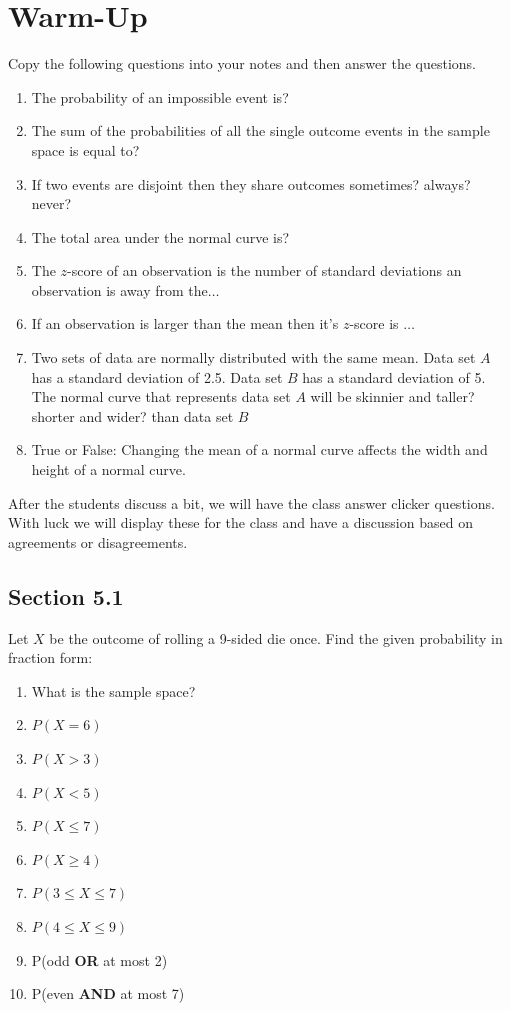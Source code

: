 \documentclass[11pt]{scrartcl}
\theoremstyle{definition}
\begin{document}
\section*{Warm-Up}
Copy the following questions into your notes and then answer the questions.
\begin{enumerate}
	\item The probability of an impossible event is?
	\item The sum of the probabilities of all the single outcome events in the sample space is equal to?
	\item If two events are disjoint then they share outcomes sometimes? always? never?
	\item The total area under the normal curve is?
	\item The $z$-score of an observation is the number of standard deviations an observation is away from the$\ldots$
	\item If an observation is larger than the mean then it's $z$-score is $\ldots$
	\item Two sets of data are normally distributed with the same mean. Data set $A$ has a standard deviation of 2.5. Data set $B$ has a standard deviation of 5. The normal curve that represents data set $A$ will be skinnier and taller? shorter and wider? than data set $B$
	\item True or False: Changing the mean of a normal curve affects the width and height of a normal curve.
	\end{enumerate}

\noindent
After the students discuss a bit, we will have the class answer clicker questions. With luck we will display these for the class and have a discussion based on agreements or disagreements.

\newpage

\subsection*{Section 5.1}
Let $X$ be the outcome of rolling a 9-sided die once. Find the given probability in fraction form:
\begin{enumerate}
	\item What is the sample space?
	\item $P(X=6)$
	\item $P(X>3)$
	\item $P(X<5)$
	\item $P(X\leq 7)$
	\item $P(X \geq 4)$
	\item $P(3 \leq X \leq 7)$
	\item $P(4 \leq X \leq 9)$
	\item P(odd \textbf{OR} at most 2)
	\item P(even \textbf{AND} at most 7)
\end{enumerate}
\end{document}
